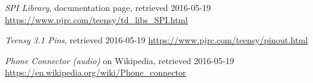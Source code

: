 \documentclass[a4paper, 11pt, titlepage]{report}
\begin{document}
\begin{thebibliography}{99}
\emph{SPI Library}, documentation page, retrieved 2016-05-19
\newline \url{https://www.pjrc.com/teensy/td\_libs\_SPI.html}

\emph{Teensy 3.1 Pins}, retrieved 2016-05-19
\newline \url{https://www.pjrc.com/teensy/pinout.html}

\emph{Phone Connector (audio)} on Wikipedia, retrieved 2016-05-19
\newline \url{https://en.wikipedia.org/wiki/Phone\_connector}




\end{thebibliography}
\end{document}
